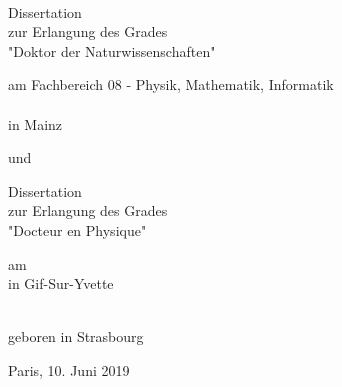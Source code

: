 
\begin{titlepage}

\begin{addmargin}[-1cm]{-3cm}
\begin{center}
\large

\hfill
\vfill

\begingroup
\color{Maroon}\spacedallcaps{\myTitle} \\ \bigskip %
\endgroup

\vfill



Dissertation \\
zur Erlangung des Grades \\
"Doktor der Naturwissenschaften" \\ \bigskip

\vfill

am Fachbereich $08$ - Physik, Mathematik, Informatik \\
 \\
in Mainz \\

\vfill

und

\vfill

Dissertation \\
zur Erlangung des Grades \\
"Docteur en Physique" \\ \bigskip

\vfill

am  \\
in Gif-Sur-Yvette


\vfill

\spacedlowsmallcaps{\myName} \\
geboren in Strasbourg


\vfill

Paris, 10. Juni 2019

\vfill

\end{center}
\end{addmargin}

\end{titlepage}
